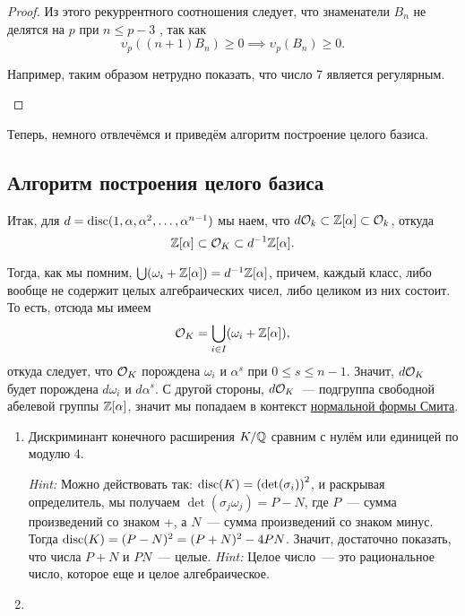 \begin{proof}
 		 Из этого рекуррентного соотношения следует, что знаменатели $B_n$ не делятся на $p$ при $n \le p - 3$ , так как 
 		 \[
 		 	\upsilon_{p}((n + 1)B_n) \ge 0 \implies \upsilon_{p}(B_n) \ge 0.
 		 \]

 		 \begin{example}
 		 	Например, таким образом нетрудно показать, что число 7 является регулярным. 
 		 \end{example}

 	\end{proof}

 	Теперь, немного отвлечёмся и приведём алгоритм построение целого базиса.

 	\subsection{Алгоритм построения целого базиса}

 	Итак, для $d = \disc(1, \alpha, \alpha^2, \ldots, \alpha^{n - 1})$ мы наем, что 
 	$d \cO_{k} \subset \Z[\alpha] \subset \cO_{k}$, откуда 
 	\[
 		\Z[\alpha] \subset \cO_{K} \subset d^{-1}\Z[\alpha].
 	\]

 	Тогда, как мы помним, $\bigcup (\omega_i + \Z[\alpha]) = d^{-1}\Z[\alpha]$, причем, каждый класс, либо вообще не содержит целых алгебраических чисел, либо целиком из них состоит. То есть, отсюда мы имеем 
 	\[
 		\cO_{K} = \bigcup_{i \in I} (\omega_{i} + \Z[\alpha]),
 	\]
 	откуда следует, что $\cO_{K}$ порождена $\omega_{i}$ и $\alpha^s$ при $0 \le s \le n - 1$. Значит, $d \cO_{K}$ будет порождена  $d\omega_{i}$ и $d \alpha^s$. С другой стороны, $d\cO_{K}$~--- подгруппа свободной абелевой группы $\Z[\alpha]$, значит мы попадаем в контекст \hyperlink{smith_normal_form}{нормальной формы Смита}.

 	\begin{homework}

 	\begin{enumerate}
 		\item \begin{theorem}[Штикельберг] 
 			Дискриминант конечного расширения $K/\Q$ сравним с нулём или единицей по модулю 4. 
 		\end{theorem}
 		\emph{Hint:} Можно действовать так: $\disc(K) = \lr*{\det(\sigma_i)}^2$, и раскрывая определитель, мы получаем $\det(\sigma_{j}\omega_{j}) = P - N$, где $P$~--- сумма произведений со знаком +, а $N$~--- сумма произведений со знаком минус. Тогда $\disc(K) = (P - N)^2 = (P + N)^2 - 4 PN$. Значит, достаточно показать, что числа $P + N$ и $PN$~--- целые.  \emph{Hint:} Целое число~--- это рациональное число, которое еще и целое алгебраическое. 
 		\item
 	\end{enumerate}
 		
 	\end{homework}





	